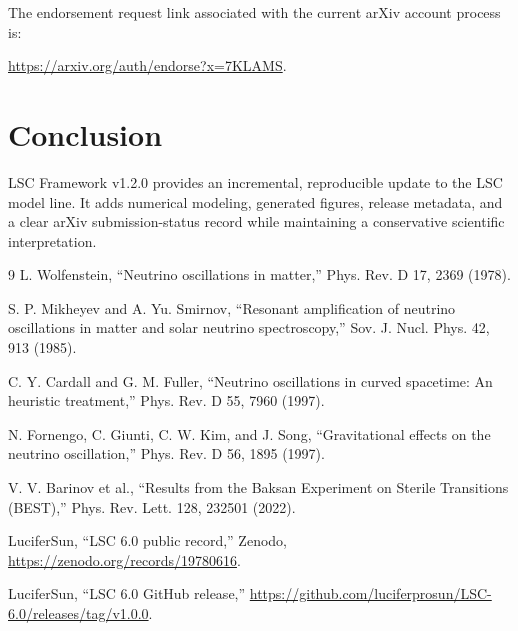 \documentclass[11pt]{article}
\begin{document}
The endorsement request link associated with the current arXiv account process is:
\begin{center}
\url{https://arxiv.org/auth/endorse?x=7KLAMS}.
\end{center}

\section{Conclusion}

LSC Framework v1.2.0 provides an incremental, reproducible update to the LSC model line. It adds numerical modeling, generated figures, release metadata, and a clear arXiv submission-status record while maintaining a conservative scientific interpretation.

\begin{thebibliography}{9}
L. Wolfenstein, ``Neutrino oscillations in matter,'' Phys. Rev. D 17, 2369 (1978).

S. P. Mikheyev and A. Yu. Smirnov, ``Resonant amplification of neutrino oscillations in matter and solar neutrino spectroscopy,'' Sov. J. Nucl. Phys. 42, 913 (1985).

C. Y. Cardall and G. M. Fuller, ``Neutrino oscillations in curved spacetime: An heuristic treatment,'' Phys. Rev. D 55, 7960 (1997).

N. Fornengo, C. Giunti, C. W. Kim, and J. Song, ``Gravitational effects on the neutrino oscillation,'' Phys. Rev. D 56, 1895 (1997).

V. V. Barinov et al., ``Results from the Baksan Experiment on Sterile Transitions (BEST),'' Phys. Rev. Lett. 128, 232501 (2022).

LuciferSun, ``LSC 6.0 public record,'' Zenodo, \url{https://zenodo.org/records/19780616}.

LuciferSun, ``LSC 6.0 GitHub release,'' \url{https://github.com/luciferprosun/LSC-6.0/releases/tag/v1.0.0}.
\end{thebibliography}
\end{document}

